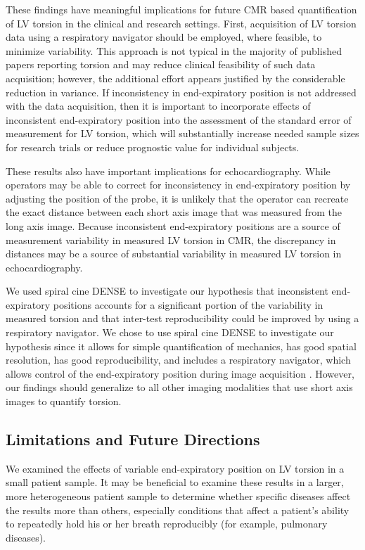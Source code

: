 	These findings have meaningful implications for future CMR based quantification of LV torsion in the clinical and research settings. First, acquisition of LV torsion data using a respiratory navigator should be employed, where feasible, to minimize variability. This approach is not typical in the majority of published papers reporting torsion and may reduce clinical feasibility of such data acquisition; however, the additional effort appears justified by the considerable reduction in variance. If inconsistency in end-expiratory position is not addressed with the data acquisition, then it is important to incorporate effects of inconsistent end-expiratory position into the assessment of the standard error of measurement for LV torsion, which will substantially increase needed sample sizes for research trials or reduce prognostic value for individual subjects.
	
	These results also have important implications for echocardiography. While operators may be able to correct for inconsistency in end-expiratory position by adjusting the position of the probe, it is unlikely that the operator can recreate the exact distance between each short axis image that was measured from the long axis image. Because inconsistent end-expiratory positions are a source of measurement variability in measured LV torsion in CMR, the discrepancy in distances may be a source of substantial variability in measured LV torsion in echocardiography.
	
	We used spiral cine DENSE to investigate our hypothesis that inconsistent end-expiratory positions accounts for a significant portion of the variability in measured torsion and that inter-test reproducibility could be improved by using a respiratory navigator. We chose to use spiral cine DENSE to investigate our hypothesis since it allows for simple quantification of mechanics, has good spatial resolution, has good reproducibility, and includes a respiratory navigator, which allows control of the end-expiratory position during image acquisition \cite{Zhong2010a,Haggerty2013,Aletras1999b,Aletras1999c}. However, our findings should generalize to all other imaging modalities that use short axis images to quantify torsion.

\subsection{Limitations and Future Directions}
	We examined the effects of variable end-expiratory position on LV torsion in a small patient sample. It may be beneficial to examine these results in a larger, more heterogeneous patient sample to determine whether specific diseases affect the results more than others, especially conditions that affect a patient's ability to repeatedly hold his or her breath reproducibly (for example, pulmonary diseases).
	
